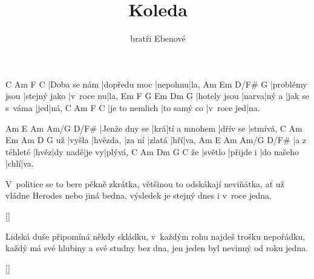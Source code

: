 \documentclass{song}
\author{bratři Ebenové}
\title{Koleda}
\begin{document}
\strophe
C            Am           F       C
|Doba se nám |dopředu moc |nepohnu|la,
Am\7           Em           D/F\#     G
|problémy jsou |stejný jako |v~roce nu|la,
Em\7         F     G     Em\7           Dm\7 G\7
|hotely jsou |narva|ný a |jak se s~váma |jed|ná,
C              Am          F          C
|je to nemlich |to samý co |v~roce jed|na.
\endstrophe

Am            E\7 Am           Am/G     D/F\#
|Jenže dny se |krá|tí a mnohem |dřív se |stmívá,
   C      Am       Em     Am     D   G
už |vyšla |hvězda, |za ní |zlatá |hří|va,
Am           E\7  Am      Am/G  D/F\#
|a z téhleté |hvěz|dy nadě|je vy|plývá,
   C       Am        Dm         G\7  C
že |světlo |přijde i |do našeho |chlí|va.
\endstrophe

\strophe*
V~politice se to bere pěkně zkrátka,
většinou to odskákají neviňátka,
ať už vládne Herodes nebo jiná bedna,
výsledek je stejný dnes i v~roce jedna.
\endstrophe

\ref{}

\strophe*
Lidská duše připomíná někdy skládku,
v~každým rohu najdeš trošku nepořádku,
každý má své hlubiny a své studny bez dna,
jen jeden byl nevinný od roku jedna.
\endstrophe

\ref{}
\end{document}
